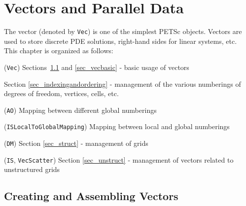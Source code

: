 
\cleardoublepage
\chapter{Vectors and Parallel Data}
\label{chapter_vectors}

The vector (denoted by \lstinline{Vec}) is one of the simplest PETSc
objects.  Vectors are used to store discrete PDE solutions, right-hand
sides for linear systems, etc. This chapter is organized as follows:

\begin{tightitemize}
  \item (\lstinline{Vec}) Sections~\ref{sec_veccreate} and \ref{sec_vecbasic} - basic usage of vectors
\item Section \ref{sec_indexingandordering} - management of the various numberings of
               degrees of freedom, vertices, cells, etc.
  \begin{tightitemize}
    \item (\lstinline{AO}) Mapping between different global numberings
    \item (\lstinline{ISLocalToGlobalMapping}) Mapping between local and global numberings
  \end{tightitemize}
\item (\lstinline{DM}) Section \ref{sec_struct} - management of grids
\item (\lstinline{IS}, \lstinline{VecScatter}) Section \ref{sec_unstruct} - management of vectors related to unstructured grids
\end{tightitemize}

\section{Creating and Assembling Vectors}
\label{sec_veccreate}

